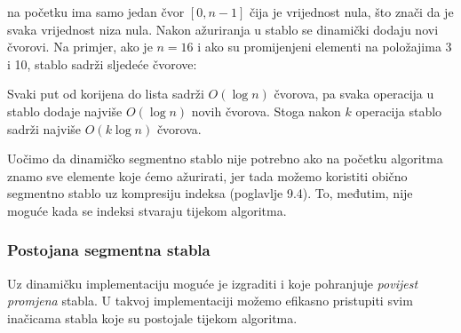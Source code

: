  na početku ima
samo jedan čvor $[0,n-1]$ čija je vrijednost nula,
što znači da je svaka vrijednost niza nula.
Nakon ažuriranja u stablo se dinamički dodaju
novi čvorovi.
Na primjer, ako je $n=16$ i ako su promijenjeni elementi
na položajima 3 i 10,
stablo sadrži sljedeće čvorove:
\begin{center}
\end{center}

Svaki put od korijena do lista sadrži
$O(\log n)$ čvorova,
pa svaka operacija u stablo dodaje najviše $O(\log n)$
novih čvorova.
Stoga nakon $k$ operacija stablo sadrži
najviše $O(k \log n)$ čvorova.

Uočimo da dinamičko segmentno stablo nije potrebno
ako na početku algoritma znamo sve elemente
koje ćemo ažurirati,
jer tada možemo koristiti obično segmentno stablo uz
kompresiju indeksa (poglavlje 9.4).
To, međutim, nije moguće kada se indeksi
stvaraju tijekom algoritma.

\subsubsection{Postojana segmentna stabla}


Uz dinamičku implementaciju
moguće je izgraditi i
 koje pohranjuje
\emph{povijest promjena} stabla.
U takvoj implementaciji možemo
efikasno pristupiti
svim inačicama stabla koje su
postojale tijekom algoritma.

